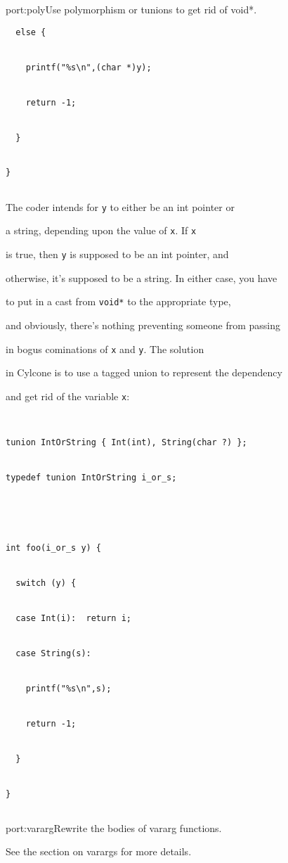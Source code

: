 \begin{porta}{port:poly}{Use polymorphism or tunions to get rid of void*.}
\begin{verbatim}
  else {


    printf("%s\n",(char *)y);


    return -1;


  }


}


\end{verbatim}


The coder intends for \texttt{y} to either be an int pointer or


a string, depending upon the value of \texttt{x}.  If \texttt{x}


is true, then \texttt{y} is supposed to be an int pointer, and


otherwise, it's supposed to be a string.  In either case, you have


to put in a cast from \texttt{void*} to the appropriate type,


and obviously, there's nothing preventing someone from passing


in bogus cominations of \texttt{x} and \texttt{y}.  The solution


in Cylcone is to use a tagged union to represent the dependency


and get rid of the variable \texttt{x}:


\begin{verbatim}


tunion IntOrString { Int(int), String(char ?) };


typedef tunion IntOrString i_or_s;





int foo(i_or_s y) {


  switch (y) {


  case Int(i):  return i;


  case String(s):  


    printf("%s\n",s);


    return -1;


  }


}


\end{verbatim}


\end{porta}





\begin{porta}{port:vararg}{Rewrite the bodies of vararg functions.}





See the section on varargs for more details.  


\end{porta}





